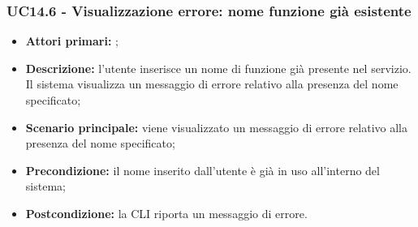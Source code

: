 \subsubsection{UC14.6 - Visualizzazione errore: nome funzione già esistente}
\begin{itemize}
	\item \textbf{Attori primari:} \us{};
	\item \textbf{Descrizione:} l’utente inserisce un nome di funzione già presente nel servizio. Il sistema visualizza un messaggio di errore relativo alla presenza del nome specificato;
	\item \textbf{Scenario principale:} viene visualizzato un messaggio di errore relativo alla presenza del nome specificato;
	\item \textbf{Precondizione:} il nome inserito dall’utente è già in uso all’interno del sistema; 
	\item \textbf{Postcondizione:} la CLI riporta un messaggio di errore.
\end{itemize}